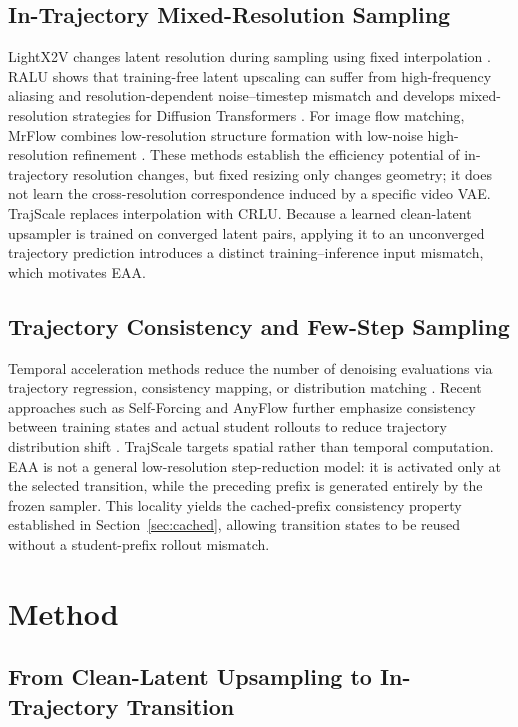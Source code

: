 \subsection{In-Trajectory Mixed-Resolution Sampling}
LightX2V changes latent resolution during sampling using fixed interpolation
\citep{lightx2v2026}. RALU shows that training-free latent upscaling can suffer
from high-frequency aliasing and resolution-dependent noise--timestep mismatch
and develops mixed-resolution strategies for Diffusion Transformers
\citep{jeong2025ralu}. For image flow matching, MrFlow combines
low-resolution structure formation with low-noise high-resolution refinement
\citep{zheng2026mrflow}. These methods establish the efficiency potential of
in-trajectory resolution changes, but fixed resizing only changes geometry; it
does not learn the cross-resolution correspondence induced by a specific video
VAE. TrajScale replaces interpolation with CRLU. Because a learned clean-latent
upsampler is trained on converged latent pairs, applying it to an unconverged
trajectory prediction introduces a distinct training--inference input
mismatch, which motivates EAA.

\subsection{Trajectory Consistency and Few-Step Sampling}
Temporal acceleration methods reduce the number of denoising evaluations via
trajectory regression, consistency mapping, or distribution matching
\citep{luo2023lcm,yin2024dmd2,zhai2024mcm}. Recent approaches such as
Self-Forcing and AnyFlow further emphasize consistency between training states
and actual student rollouts to reduce trajectory distribution shift
\citep{huang2025selfforcing,gu2026anyflow}. TrajScale targets spatial rather
than temporal computation. EAA is not a general low-resolution step-reduction
model: it is activated only at the selected transition, while the preceding
prefix is generated entirely by the frozen sampler. This locality yields the
cached-prefix consistency property established in
Section~\ref{sec:cached}, allowing transition states to be reused without a
student-prefix rollout mismatch.

\section{Method}
\label{sec:method}

\subsection{From Clean-Latent Upsampling to In-Trajectory Transition}
\label{sec:transition_overview}

